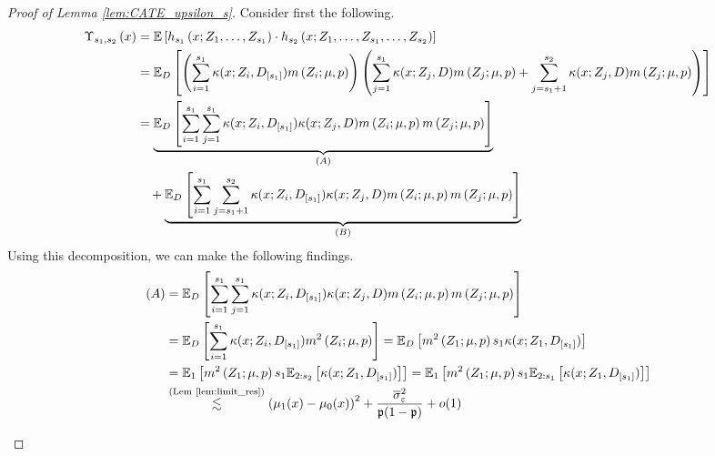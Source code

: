 \begin{proof}[Proof of Lemma \ref{lem:CATE_upsilon_s}]
	Consider first the following.
	\begin{equation}
		\begin{aligned}
			\Upsilon_{s_1, s_2}\left(x\right)
			& = \mathbb{E}\left[h_{s_1}\left(x; Z_1, \ldots,  Z_{s_1}\right) \cdot
			h_{s_2}\left(x; Z_1, \ldots,Z_{s_1}, \ldots, Z_{s_2}\right)\right]\\
			& = \mathbb{E}_{D}\left[
				\left(\sum_{i = 1}^{s_1} \kappa(x; Z_{i}, D_{[s_1]}) m\left(Z_{i}; \mu, p\right)\right)
				\left(\sum_{j = 1}^{s_1} \kappa(x; Z_{j}, D) m\left(Z_{j}; \mu, p\right) 
				+ \sum_{j = s_1 + 1}^{s_2} \kappa(x; Z_{j}, D) m\left(Z_{j}; \mu, p\right)\right)
			\right]     \\
			& = \underbrace{\mathbb{E}_{D}\left[\sum_{i = 1}^{s_1}\sum_{j = 1}^{s_1}\kappa(x; Z_{i}, D_{[s_1]})\kappa(x; Z_{j}, D) m\left(Z_{i}; \mu, p\right)m\left(Z_{j}; \mu, p\right)\right]}_{(A)}\\
			& \quad + \underbrace{\mathbb{E}_{D}\left[\sum_{i = 1}^{s_1}\sum_{j = s_1 + 1}^{s_2}\kappa(x; Z_{i}, D_{[s_1]})\kappa(x; Z_{j}, D) m\left(Z_{i}; \mu, p\right)m\left(Z_{j}; \mu, p\right)\right]}_{(B)}
		\end{aligned}
	\end{equation}
	Using this decomposition, we can make the following findings.
	\begin{equation}
		\begin{aligned}
			(A)
			& = \mathbb{E}_{D}\left[\sum_{i = 1}^{s_1}\sum_{j = 1}^{s_1}\kappa(x; Z_{i}, D_{[s_1]})\kappa(x; Z_{j}, D) m\left(Z_{i}; \mu, p\right)m\left(Z_{j}; \mu, p\right)\right] \\
			& = \mathbb{E}_{D}\left[\sum_{i = 1}^{s_1} \kappa(x; Z_{i}, D_{[s_1]}) m^2\left(Z_{i}; \mu, p\right)\right] 
			= \mathbb{E}_{D}\left[m^2\left(Z_{1}; \mu, p\right) s_1 \kappa(x; Z_{1}, D_{[s_1]}) \right] \\
			& = \mathbb{E}_{1}\left[m^2\left(Z_{1}; \mu, p\right) s_1 \mathbb{E}_{2:s_2}\left[\kappa(x; Z_{1}, D_{[s_1]})\right]\right]
			= \mathbb{E}_{1}\left[m^2\left(Z_{1}; \mu, p\right) s_1 \mathbb{E}_{2:s_1}\left[\kappa(x; Z_{1}, D_{[s_1]})\right]\right]\\
			& \overset{\text{(Lem \ref{lem:limit_res})}}{\lesssim} \left(\mu_1(x) - \mu_0(x)\right)^2 + \frac{\overline{\sigma}^2_{\varepsilon}}{\mathfrak{p}(1 - \mathfrak{p})} + o(1)
		\end{aligned}
	\end{equation}
	\begin{equation}
		\begin{aligned}

\end{aligned}
\end{equation}
\end{proof}
